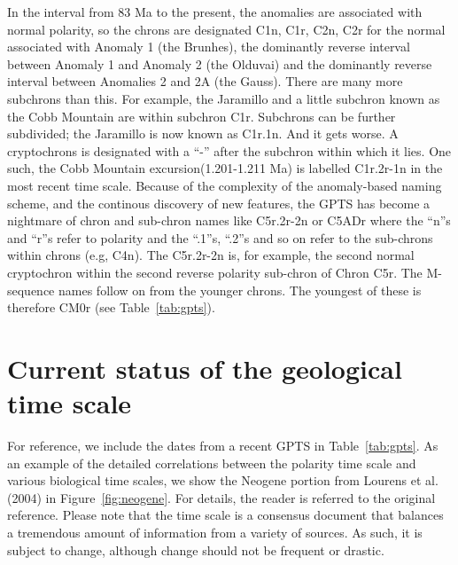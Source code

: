 In the interval from 83 Ma to the present, the anomalies are associated with normal polarity, so the chrons are designated C1n, C1r, C2n, C2r for the normal associated with Anomaly 1 (the Brunhes), the dominantly reverse interval between Anomaly 1 and Anomaly 2 (the Olduvai) and the dominantly reverse interval between Anomalies 2 and 2A (the Gauss).    There are many more subchrons than this.  For example, the Jaramillo and  a little subchron known as the Cobb Mountain are within subchron C1r.    Subchrons can be further subdivided; the Jaramillo is now known as C1r.1n.   And it gets worse.   A cryptochrons is designated with a ``-'' after the subchron within which it lies.  One such, the  Cobb Mountain  excursion(1.201-1.211 Ma) is labelled C1r.2r-1n in the most recent time scale.       Because of the complexity of the anomaly-based  naming scheme, and the continous discovery of new features,  the  GPTS has become  a nightmare of chron and sub-chron names like C5r.2r-2n or C5ADr where the ``n''s and ``r''s refer to polarity and the ``.1''s,  ``.2''s and so on refer to the sub-chrons within chrons (e.g, C4n). The C5r.2r-2n is, for example,  the second normal cryptochron within the second reverse polarity sub-chron of Chron C5r.       \nocite{gee07,channell95,cande95,lowrie04}
The M-sequence names   follow on from the younger chrons.  The youngest of these is therefore CM0r (see Table~\ref{tab:gpts}).  


\section {Current status of the geological time scale}

For reference, we include the dates from a  recent GPTS in Table~\ref{tab:gpts}.  As an example of the detailed correlations between the polarity time scale and various biological time scales, we show the Neogene portion from Lourens et al. (2004) in Figure~\ref{fig:neogene}.    For details, the reader is referred to the original reference.  Please note that the time scale is a consensus document that balances a tremendous amount of information from a variety of sources.  As such, it is subject to change, although  change should not be frequent or drastic.   


